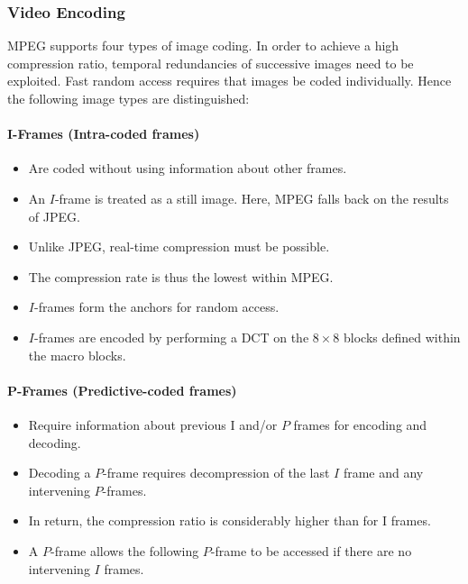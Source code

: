 \subsubsection{Video Encoding}
MPEG supports four types of image coding. In order to achieve a high compression ratio, temporal redundancies of successive images need to be exploited. Fast random access requires that images be coded individually. Hence the following image types are distinguished:

\paragraph{I-Frames (Intra-coded frames)}
	\begin{itemize}
	\item Are coded without using information about other frames.
	\item An $ I $-frame is treated as a still image. Here, MPEG	falls back on the results of JPEG.
	\item Unlike JPEG, real-time compression must be possible.
	\item The compression rate is thus the lowest within MPEG. 
	\item $ I $-frames form the anchors for random access.
	\item $ I $-frames are encoded by performing a DCT on the $ 8\times8 $ blocks defined within the macro blocks.
	\end{itemize}




\paragraph{P-Frames (Predictive-coded frames)}
\begin{itemize}
	\item Require information about previous I and/or $ P $	frames for encoding and decoding. 
	\item Decoding a $ P $-frame requires decompression of the last $ I $ frame and any intervening $ P $-frames. 
	\item In return, the compression ratio is considerably higher than for I frames. 
	\item A $ P $-frame allows the following $ P $-frame to	be accessed if there are no intervening $ I $ frames.
\end{itemize}


